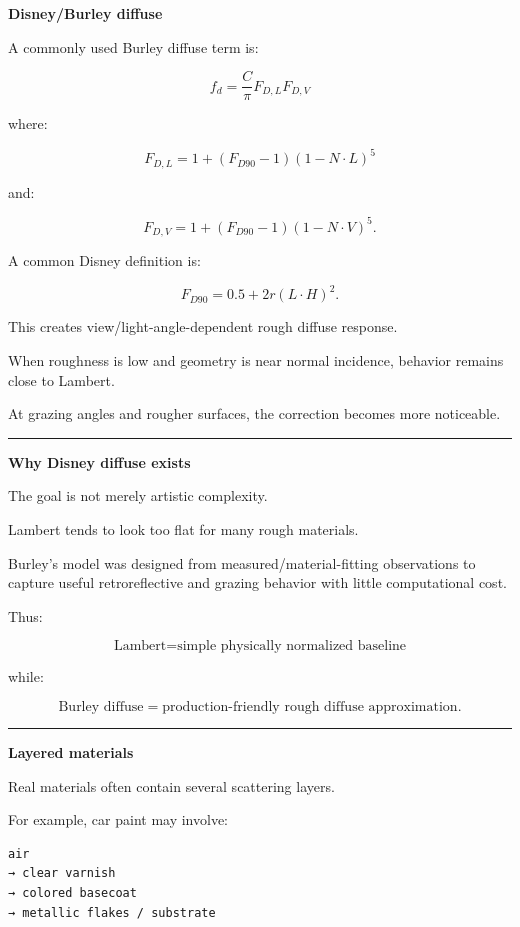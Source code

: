 \textbf{Disney/Burley diffuse}

A commonly used Burley diffuse term is:

\[
\boxed{
f_d=
\frac{C}{\pi}
F_{D,L}
F_{D,V}
}
\]

where:

\[
F_{D,L}
=
1+
(F_{D90}-1)(1-N\cdot L)^5
\]

and:

\[
F_{D,V}
=
1+
(F_{D90}-1)(1-N\cdot V)^5.
\]

A common Disney definition is:

\[
\boxed{
F_{D90}
=
0.5+
2r(L\cdot H)^2.
}
\]

This creates view/light-angle-dependent rough diffuse response.

When roughness is low and geometry is near normal incidence, behavior remains close to Lambert.

At grazing angles and rougher surfaces, the correction becomes more noticeable.

\begin{center}\rule{0.5\linewidth}{0.5pt}\end{center}

\textbf{Why Disney diffuse exists}

The goal is not merely artistic complexity.

Lambert tends to look too flat for many rough materials.

Burley's model was designed from measured/material-fitting observations to capture useful retroreflective and grazing behavior with little computational cost.

Thus:

\[
\boxed{
\text{Lambert}
=
\text{simple physically normalized baseline}
}
\]

while:

\[
\boxed{
\text{Burley diffuse}
=
\text{production-friendly rough diffuse approximation}.
}
\]

\begin{center}\rule{0.5\linewidth}{0.5pt}\end{center}

\textbf{Layered materials}

Real materials often contain several scattering layers.

For example, car paint may involve:

\begin{verbatim}
air
→ clear varnish
→ colored basecoat
→ metallic flakes / substrate
\end{verbatim}

